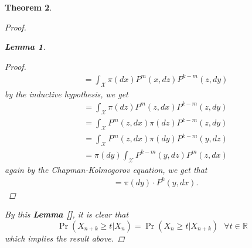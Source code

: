 \documentclass{article}
\newtheorem{theorem}{Theorem}[section]
\newtheorem{lemma}[theorem]{Lemma}
\begin{document}
\begin{theorem}
\begin{proof}
\begin{lemma}
\begin{proof}
\begin{align*}
						&= \int_{\mathcal{X}} \pi(dx) P^m(x, dz) P^{k-m}(z, dy)
					\end{align*}
					by the inductive hypothesis, we get
					\begin{align*}
						&= \int_{\mathcal{X}} \pi(dz) P^m(z, dx) P^{k-m}(z, dy) \\
						&= \int_{\mathcal{X}} P^m(z, dx) \pi(dz) P^{k-m}(z, dy) \\
						&= \int_{\mathcal{X}} P^m(z, dx) \pi(dy) P^{k-m}(y, dz) \\
						&= \pi(dy) \int_{\mathcal{X}}  P^{k-m}(y, dz) P^m(z, dx)
					\end{align*}
					again by the Chapman-Kolmogorov equation, we get that
					\begin{align*}
						&= \pi(dy) \cdot P^k(y, dx).
					\end{align*}
				\end{proof}
			\end{lemma}
			By this \textbf{Lemma []}, it is clear that
			\begin{equation*}
				\Pr (X_{n+k} \geq t | X_n) = \Pr (X_n \geq t | X_{n+k}) \text{  } \forall t \in \mathbb{R}
			\end{equation*}
			which implies the result above.
		\end{proof}
	\end{theorem}
\end{document}
